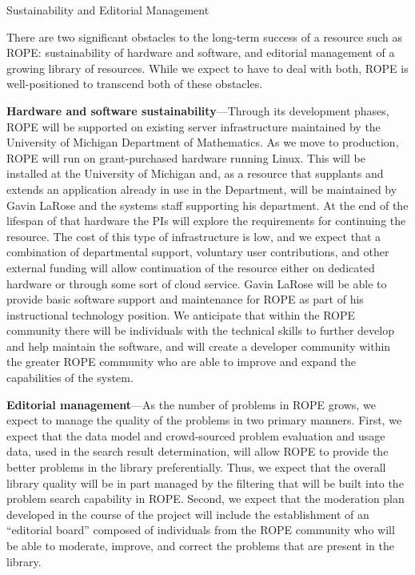 \documentclass[11pt]{article}
\begin{document}
\begin{section}{Sustainability and Editorial Management}

There are two significant obstacles to the long-term success of a resource
such as ROPE: sustainability of hardware and software, and editorial
management of a growing library of resources.  While we expect to have to
deal with both, ROPE is well-positioned to transcend both of these
obstacles.

\textbf{Hardware and software sustainability}---Through its development
phases, ROPE will be supported on existing server infrastructure
maintained by the University of Michigan Department of Mathematics.  As we
move to production, ROPE will run on grant-purchased hardware running
Linux.  This will be installed at the University of Michigan and, as a
resource that supplants and extends an application already in use in the
Department, will be maintained by Gavin LaRose and the systems staff
supporting his department.  At the end of the lifespan of that hardware
the PIs will explore the requirements for continuing the resource.  The
cost of this type of infrastructure is low, and we expect that a
combination of departmental support, voluntary user contributions, and
other external funding will allow continuation of the resource either on
dedicated hardware or through some sort of cloud service.  Gavin LaRose
will be able to provide basic software support and maintenance for ROPE as
part of his instructional technology position.  We anticipate that within
the ROPE community there will be individuals with the technical skills to
further develop and help maintain the software, and will create a
developer community within the greater ROPE community who are able to
improve and expand the capabilities of the system.

\textbf{Editorial management}---As the number of problems in ROPE grows,
we expect to manage the quality of the problems in two primary manners.
First, we expect that the data model and crowd-sourced problem evaluation
and usage data, used in the search result determination, will allow ROPE
to provide the better problems in the library preferentially.  Thus, we
expect that the overall library quality will be in part managed by the
filtering that will be built into the problem search capability in ROPE.
Second, we expect that the moderation plan developed in the course of the
project will include the establishment of an ``editorial board'' composed
of individuals from the ROPE community who will be able to moderate,
improve, and correct the problems that are present in the library.

\end{section}
\end{document}
